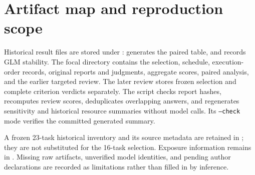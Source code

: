 \documentclass[11pt]{article}
\begin{document}
\section{Artifact map and reproduction scope}
Historical result files are stored under :  generates the paired table, and  records GLM stability. The focal directory contains the selection, schedule, execution-order records, original reports and judgments, aggregate scores, paired analysis, and the earlier targeted review. The later review stores frozen selection and complete criterion verdicts separately. The script  checks report hashes, recomputes review scores, deduplicates overlapping answers, and regenerates sensitivity and historical resource summaries without model calls. Its \texttt{--check} mode verifies the committed generated summary.

A frozen 23-task historical inventory and its source metadata are retained in ; they are not substituted for the 16-task selection. Exposure information remains in . Missing raw artifacts, unverified model identities, and pending author declarations are recorded as limitations rather than filled in by inference.
\end{document}
